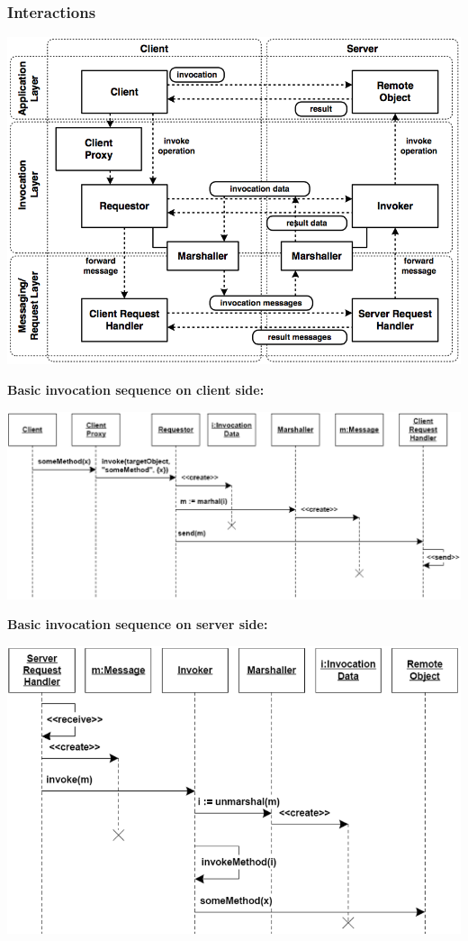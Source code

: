 \documentclass[10pt]{article}
\begin{document}
\subsubsection{Interactions}
\begin{center}
	\includegraphics[scale=0.25]{images/interactions.png}
\end{center}
\textbf{Basic invocation sequence on client side:}
\begin{center}
	\includegraphics[scale=0.25]{images/invocation-client.png}
\end{center}
\textbf{Basic invocation sequence on server side:}
\begin{center}
	\includegraphics[scale=0.25]{images/invocation-server.png}
\end{center}
\end{document}
